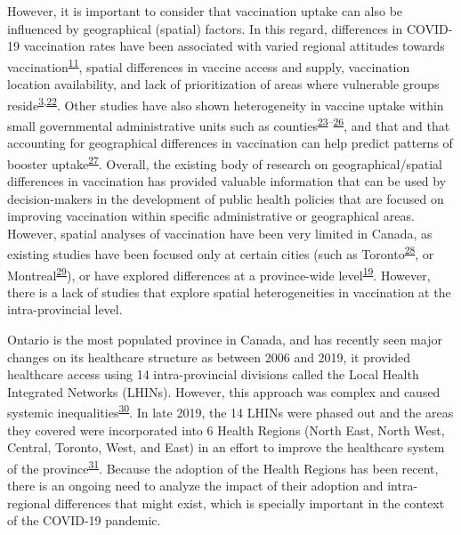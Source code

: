 \documentclass[
  letterpaper,
  DIV=11,
  numbers=noendperiod]{scrartcl}
\begin{document}
However, it is important to consider that vaccination uptake can also be
influenced by geographical (spatial) factors. In this regard,
differences in COVID-19 vaccination rates have been associated with
varied regional attitudes towards
vaccination\textsuperscript{\protect\hyperlink{ref-malik2020}{11}},
spatial differences in vaccine access and supply, vaccination location
availability, and lack of prioritization of areas where vulnerable
groups
reside\textsuperscript{\protect\hyperlink{ref-bogoch2022}{3},\protect\hyperlink{ref-nguyen2021}{22}}.
Other studies have also shown heterogeneity in vaccine uptake within
small governmental administrative units such as
counties\textsuperscript{\protect\hyperlink{ref-mollalo2021}{23}--\protect\hyperlink{ref-bhuiyan2022}{26}},
and that and that accounting for geographical differences in vaccination
can help predict patterns of booster
uptake\textsuperscript{\protect\hyperlink{ref-wood2022}{27}}. Overall,
the existing body of research on geographical/spatial differences in
vaccination has provided valuable information that can be used by
decision-makers in the development of public health policies that are
focused on improving vaccination within specific administrative or
geographical areas. However, spatial analyses of vaccination have been
very limited in Canada, as existing studies have been focused only at
certain cities (such as
Toronto\textsuperscript{\protect\hyperlink{ref-choi2021}{28}}, or
Montreal\textsuperscript{\protect\hyperlink{ref-mckinnon2021}{29}}), or
have explored differences at a province-wide
level\textsuperscript{\protect\hyperlink{ref-guay2022}{19}}. However,
there is a lack of studies that explore spatial heterogeneities in
vaccination at the intra-provincial level.

Ontario is the most populated province in Canada, and has recently seen
major changes on its healthcare structure as between 2006 and 2019, it
provided healthcare access using 14 intra-provincial divisions called
the Local Health Integrated Networks (LHINs). However, this approach was
complex and caused systemic
inequalities\textsuperscript{\protect\hyperlink{ref-tsasis2012}{30}}. In
late 2019, the 14 LHINs were phased out and the areas they covered were
incorporated into 6 Health Regions (North East, North West, Central,
Toronto, West, and East) in an effort to improve the healthcare system
of the province\textsuperscript{\protect\hyperlink{ref-dong2022}{31}}.
Because the adoption of the Health Regions has been recent, there is an
ongoing need to analyze the impact of their adoption and intra-regional
differences that might exist, which is specially important in the
context of the COVID-19 pandemic.
\end{document}
